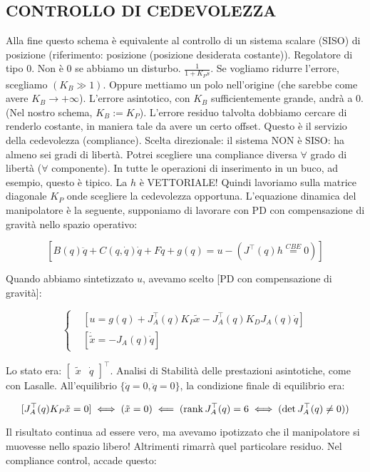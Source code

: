 \subsection{CONTROLLO DI CEDEVOLEZZA}

Alla fine questo schema è equivalente al controllo di un sistema scalare (SISO) di posizione (riferimento: posizione (posizione desiderata costante)). Regolatore di tipo 0. Non è 0 se abbiamo un disturbo. $\frac{1}{1+K_Ps}$. Se vogliamo ridurre l'errore, scegliamo $(K_B\gg 1)$. Oppure mettiamo un polo nell'origine (che sarebbe come avere $K_B\to +\infty$). L'errore asintotico, con $K_B$ sufficientemente grande, andrà a 0. (Nel nostro schema, $K_B := K_P$). L'errore residuo talvolta dobbiamo cercare di renderlo costante, in maniera tale da avere un certo offset. Questo è il servizio della cedevolezza (compliance). Scelta direzionale: il sistema NON è SISO: ha almeno sei gradi di libertà. Potrei scegliere una compliance diversa $\forall$ grado di libertà ($\forall$ componente). In tutte le operazioni di inserimento in un buco, ad esempio, questo è tipico. La $h$ è VETTORIALE! Quindi lavoriamo sulla matrice diagonale $K_P$ onde scegliere la cedevolezza opportuna. L'equazione dinamica del manipolatore è la seguente, supponiamo di lavorare con PD con compensazione di gravità nello spazio operativo:

\[
	[B(q)\ddot{q} + C(q,\dot{q})\dot{q} +F\dot{q} + g(q) = u -(J^\top(q)h \stackrel{CBE}{=} 0)]
\]

Quando abbiamo sintetizzato $u$, avevamo scelto [PD con compensazione di gravità]:

\[
	\left\{
	\begin{aligned}
	&[u = g(q) + J_A^\top(q)K_P\tilde{x} - J_A^\top(q)K_DJ_A(q)\dot{q}]\\
	&[\dot{\tilde{x}} = -J_A(q)\dot{q}]
	\end{aligned}
	\right.
\]

Lo stato era: $\begin{bmatrix}\tilde{x}&\dot{q}\end{bmatrix}^\top$. Analisi di Stabilità delle prestazioni asintotiche, come con Lasalle. All'equilibrio $\{\dot{q}=0,\ddot{q}=0\}$, la condizione finale di equilibrio era:

\[
	[J_A^\top(q)K_P\tilde{x}=0] \iff (\tilde{x}=0) \impliedby (\operatorname{rank}{J_A^\top(q)}=6 \iff (\det{J_A^\top(q)}\neq 0))
\] 

Il risultato continua ad essere vero, ma avevamo ipotizzato che il manipolatore si muovesse nello spazio libero! Altrimenti rimarrà quel particolare residuo. Nel compliance control, accade questo:


